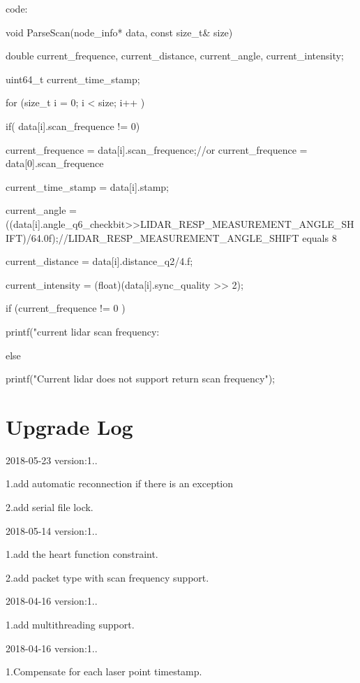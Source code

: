 code\+: \begin{DoxyVerb}    void ParseScan(node_info* data, const size_t& size) {

        double current_frequence, current_distance, current_angle, current_intensity;

        uint64_t current_time_stamp;

        for (size_t i = 0; i < size; i++ ) {

            if( data[i].scan_frequence != 0) {

                current_frequence =  data[i].scan_frequence;//or current_frequence = data[0].scan_frequence

            }

            current_time_stamp = data[i].stamp;

            current_angle = ((data[i].angle_q6_checkbit>>LIDAR_RESP_MEASUREMENT_ANGLE_SHIFT)/64.0f);//LIDAR_RESP_MEASUREMENT_ANGLE_SHIFT equals 8

            current_distance =  data[i].distance_q2/4.f;

            current_intensity = (float)(data[i].sync_quality >> 2);

        }

        if (current_frequence != 0 ) {

            printf("current lidar scan frequency: %

        } else {

            printf("Current lidar does not support return scan frequency\n");

        }
    }
\end{DoxyVerb}


\section*{Upgrade Log }

2018-\/05-\/23 version\+:1..

1.\+add automatic reconnection if there is an exception

2.\+add serial file lock.

2018-\/05-\/14 version\+:1..

1.\+add the heart function constraint.

2.\+add packet type with scan frequency support.

2018-\/04-\/16 version\+:1..

1.\+add multithreading support.

2018-\/04-\/16 version\+:1..

1.\+Compensate for each laser point timestamp. 